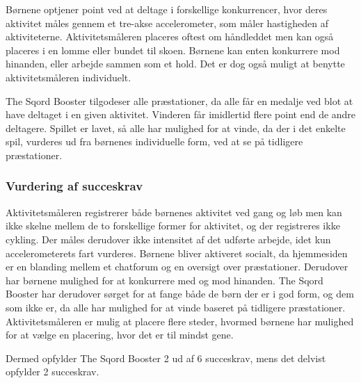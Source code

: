 Børnene optjener point ved at deltage i forskellige konkurrencer, hvor deres aktivitet måles gennem et tre-akse accelerometer, som måler hastigheden af aktiviteterne. Aktivitetsmåleren placeres oftest om håndleddet men kan også placeres i en lomme eller bundet til skoen. \citep{Sqord_family2015} \newline Børnene kan enten konkurrere mod hinanden, eller arbejde sammen som et hold. Det er dog også muligt at benytte aktivitetsmåleren individuelt. \citep{Sqord_family2015,Sqord_group2015}

The Sqord Booster tilgodeser alle præstationer, da alle får en medalje ved blot at have deltaget i en given aktivitet. Vinderen får imidlertid flere point end de andre deltagere. Spillet er lavet, så alle har mulighed for at vinde, da der i det enkelte spil, vurderes ud fra børnenes individuelle form, ved at se på tidligere præstationer. \citep{Sqord_family2015}

\subsubsection{Vurdering af succeskrav}
Aktivitetsmåleren registrerer både børnenes aktivitet ved gang og løb men kan ikke skelne mellem de to forskellige former for aktivitet, og der registreres ikke cykling. Der måles derudover ikke intensitet af det udførte arbejde, idet kun accelerometerets fart vurderes. \newline
Børnene bliver aktiveret socialt, da hjemmesiden er en blanding mellem et chatforum og en oversigt over præstationer. Derudover har børnene mulighed for at konkurrere med og mod hinanden. The Sqord Booster har derudover sørget for at fange både de børn der er i god form, og dem som ikke er, da alle har mulighed for at vinde baseret på tidligere præstationer. Aktivitetsmåleren er mulig at placere flere steder, hvormed børnene har mulighed for at vælge en placering, hvor det er til mindst gene.

Dermed opfylder The Sqord Booster 2 ud af 6 succeskrav, mens det delvist opfylder 2 succeskrav.

